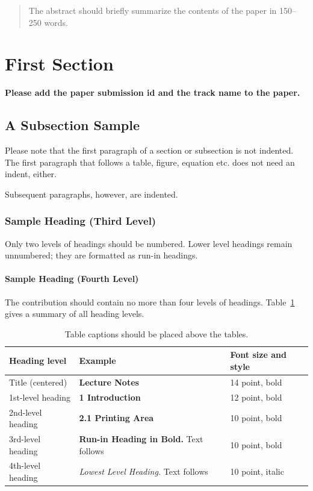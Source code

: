 \documentclass[runningheads]{llncs}
\begin{document}
\begin{abstract}
The abstract should briefly summarize the contents of the paper in
150--250 words.

\end{abstract}
%
%
%
\section{First Section}
\textbf{Please add the paper submission id and the track name to the paper.}
 
\subsection{A Subsection Sample}
Please note that the first paragraph of a section or subsection is
not indented. The first paragraph that follows a table, figure,
equation etc. does not need an indent, either.

Subsequent paragraphs, however, are indented.

\subsubsection{Sample Heading (Third Level)} Only two levels of
headings should be numbered. Lower level headings remain unnumbered;
they are formatted as run-in headings.

\paragraph{Sample Heading (Fourth Level)}
The contribution should contain no more than four levels of
headings. Table~\ref{tab1} gives a summary of all heading levels.

\begin{table}
\caption{Table captions should be placed above the
tables.}\label{tab1}
\begin{tabular}{|l|l|l|}
\hline
Heading level &  Example & Font size and style\\
\hline
Title (centered) &  {\Large\bfseries Lecture Notes} & 14 point, bold\\
1st-level heading &  {\large\bfseries 1 Introduction} & 12 point, bold\\
2nd-level heading & {\bfseries 2.1 Printing Area} & 10 point, bold\\
3rd-level heading & {\bfseries Run-in Heading in Bold.} Text follows & 10 point, bold\\
4th-level heading & {\itshape Lowest Level Heading.} Text follows & 10 point, italic\\
\hline
\end{tabular}
\end{table}
\end{document}
